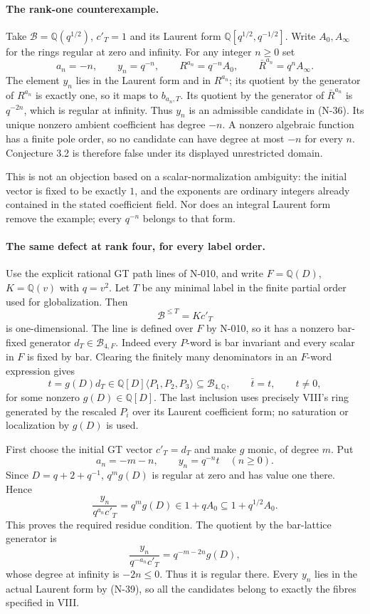 \paragraph{The rank-one counterexample.}
Take $\mathcal B=\mathbb Q(q^{1/2})$, $c'_T=1$ and its Laurent
form $\mathbb Q[q^{1/2},q^{-1/2}]$.  Write $A_0,A_\infty$ for
the rings regular at zero and infinity.  For any integer $n\ge0$ set
\[
 a_n=-n,\qquad y_n=q^{-n},\qquad
 R^{a_n}=q^{-n}A_0,\qquad\bar R^{a_n}=q^n A_\infty.
 \tag{N-37}
\]
The element $y_n$ lies in the Laurent form and in $R^{a_n}$;
its quotient by the generator of $R^{a_n}$ is exactly one, so
it maps to $b_{a_n,T}$.  Its quotient by the generator of
$\bar R^{a_n}$ is $q^{-2n}$, which is regular at infinity.
Thus $y_n$ is an admissible candidate in (N-36).  Its unique
nonzero ambient coefficient has degree $-n$.  A nonzero algebraic
function has a finite pole order, so no candidate can have degree
at most $-n$ for every $n$.  Conjecture 3.2 is therefore false
under its displayed unrestricted domain.

This is not an objection based on a scalar-normalization ambiguity:
the initial vector is fixed to be exactly $1$, and the exponents
are ordinary integers already contained in the stated coefficient
field.  Nor does an integral Laurent form remove the example;
every $q^{-n}$ belongs to that form.

\paragraph{The same defect at rank four, for every label order.}
Use the explicit rational GT path lines of N-010, and write
$F=\mathbb Q(D)$, $K=\mathbb Q(v)$ with $q=v^2$.
Let $T$ be any minimal label in the finite partial order used for
globalization.  Then
\[
                  \mathcal B^{\le T}=Kc'_T
 \tag{N-38}
\]
is one-dimensional.  The line is defined over $F$ by N-010, so
it has a nonzero bar-fixed generator $d_T\in\mathcal B_{4,F}$.
Indeed every $P$-word is bar invariant and every scalar in $F$
is fixed by bar.  Clearing the finitely many denominators in an
$F$-word expression gives
\[
 t=g(D)d_T\in\mathbb Q[D]\langle P_1,P_2,P_3\rangle
                  \subseteq\mathcal B_{4,\mathbb Q},
 \qquad \bar t=t,\qquad t\ne0,
 \tag{N-39}
\]
for some nonzero $g(D)\in\mathbb Q[D]$.
The last inclusion uses precisely VIII's ring generated by the
rescaled $P_i$ over its Laurent coefficient form; no saturation
or localization by $g(D)$ is used.

First choose the initial GT vector $c'_T=d_T$ and make $g$ monic,
of degree $m$.  Put
\[
                 a_n=-m-n,\qquad y_n=q^{-n}t
                      \quad(n\ge0).
 \tag{N-40}
\]
Since $D=q+2+q^{-1}$,
$q^m g(D)$ is regular at zero and has value one there.  Hence
\[
 \frac{y_n}{q^{a_n}c'_T}=q^m g(D)\in1+qA_0
                                      \subseteq1+q^{1/2}A_0.
 \tag{N-41}
\]
This proves the required residue condition.  The quotient by
the bar-lattice generator is
\[
 \frac{y_n}{q^{-a_n}c'_T}=q^{-m-2n}g(D),
 \tag{N-42}
\]
whose degree at infinity is $-2n\le0$.  Thus it is regular there.
Every $y_n$ lies in the actual Laurent form by (N-39), so all the
candidates belong to exactly the fibres specified in VIII.


